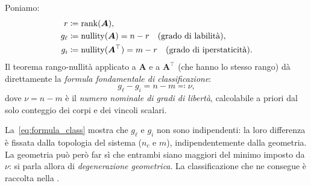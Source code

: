 Poniamo:
\begin{align}
	r &\coloneqq \operatorname{rank}(\bm{A}), \label{eq:rango}\\
	g_\ell &\coloneqq \operatorname{nullity}(\bm{A}) = n - r
	\quad \text{(grado di labilità)},\label{eq:labilita}\\
	g_i &\coloneqq \operatorname{nullity}(\bm{A}^{\top}) = m - r
	\quad \text{(grado di iperstaticità)}.\label{eq:iperstaticita}
\end{align}
Il teorema rango-nullità applicato a $\bm{A}$ e a
$\bm{A}^{\top}$ (che hanno lo stesso rango) dà direttamente
la \emph{formula fondamentale di classificazione}:
\begin{equation}\label{eq:formula_class}
g_\ell - g_i 
		= n - m \eqqcolon \nu,
\end{equation}
dove $\nu = n - m$ è il \emph{numero nominale di gradi
	di libertà}, calcolabile a priori dal solo conteggio dei
corpi e dei vincoli scalari.

La~\eqref{eq:formula_class} mostra che $g_\ell$ e
$g_i$ non sono indipendenti: la loro differenza
è fissata dalla topologia del sistema ($n_c$ e $m$),
indipendentemente dalla geometria. La geometria può però
far sì che entrambi siano maggiori del minimo imposto da
$\nu$: si parla allora di \emph{degenerazione geometrica}. La
classificazione che ne consegue è raccolta nella
.




